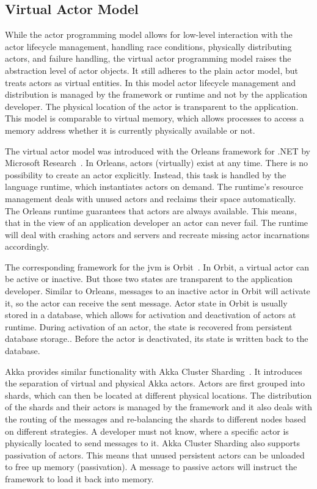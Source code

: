   \subsection{Virtual Actor Model}
  While the actor programming model allows for low-level interaction with the actor lifecycle management, handling race conditions, physically distributing actors, and failure handling, the virtual actor programming model raises the abstraction level of actor objects.
  It still adheres to the plain actor model, but treats actors as virtual entities.
  In this model actor lifecycle management and distribution is managed by the framework or runtime and not by the application developer.
  The physical location of the actor is transparent to the application.
  This model is comparable to virtual memory, which allows processes to access a memory address whether it is currently physically available or not.

  The virtual actor model was introduced with the Orleans framework for .NET by Microsoft Research~\cite{bernstein:orleans}.
  In Orleans, actors (virtually) exist at any time.
  There is no possibility to create an actor explicitly.
  Instead, this task is handled by the language runtime, which instantiates actors on demand.
  The runtime's resource management deals with unused actors and reclaims their space automatically.
  The Orleans runtime guarantees that actors are always available.
  This means, that in the view of an application developer an actor can never fail.
  The runtime will deal with crashing actors and servers and recreate missing actor incarnations accordingly.

  The corresponding framework for the \gls{jvm} is Orbit~\cite{orbit}.
  In Orbit, a virtual actor can be active or inactive.
  But those two states are transparent to the application developer.
  Similar to Orleans, messages to an inactive actor in Orbit will activate it, so the actor can receive the sent message.
  Actor state in Orbit is usually stored in a database, which allows for activation and deactivation of actors at runtime.
  During activation of an actor, the state is recovered from persistent database storage..
  Before the actor is deactivated, its state is written back to the database.

  Akka provides similar functionality with Akka Cluster Sharding~\cite{akka:clustersharding}.
  It introduces the separation of virtual and physical Akka actors.
  Actors are first grouped into shards, which can then be located at different physical locations.
  The distribution of the shards and their actors is managed by the framework and it also deals with the routing of the messages and re-balancing the shards to different nodes based on different strategies.
  A developer must not know, where a specific actor is physically located to send messages to it.
  Akka Cluster Sharding also supports passivation of actors.
  This means that unused persistent actors can be unloaded to free up memory (passivation).
  A message to passive actors will instruct the framework to load it back into memory.

